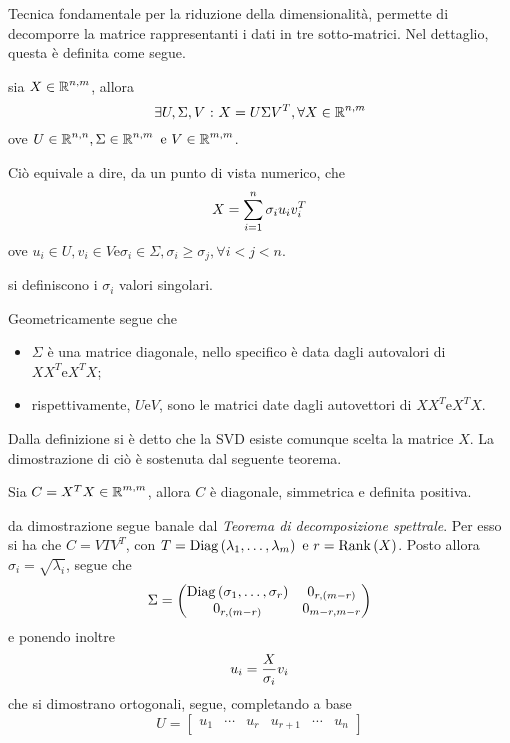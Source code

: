 \documentclass{subfiles}
\begin{document}
Tecnica fondamentale per la riduzione della dimensionalità, permette di decomporre la matrice rappresentanti i dati in tre sotto-matrici.
Nel dettaglio, questa è definita come segue.
\begin{Definition*}
    sia $X \in \operatorname{\mathbb{R}}^{n,m}$, allora
    $$
        \exists U, \Sigma, V \operatorname{\, : \,} X = U\Sigma V^{T}, \forall X \in \operatorname{\mathbb{R}}^{n, m}
    $$
    ove $U \in \Real^{n,n} , \Sigma \in \Real^{n,m} \text{e} V \in \Real^{m,m}$.
\end{Definition*}
Ciò equivale a dire, da un punto di vista numerico, che
$$
    X = \Sum{\sigma_{i}u_{i}v_{i}^{T}}{i = 1}[n]
$$
ove $u_{i} \in U, v_{i} \in V \text{e} \sigma_{i} \in \Sigma, \sigma_{i} \ge \sigma_{j}, \forall i < j < n$.\\
\begin{MarginNote}
    si definiscono i $\sigma_{i}$ valori singolari.
\end{MarginNote}
Geometricamente segue che
\begin{itemize}
    \item $\Sigma$ è una matrice diagonale, nello specifico è data dagli autovalori di $XX^{T} \text{e} X^{T}X$;
    \item rispettivamente, $U \text{e} V$, sono le matrici date dagli autovettori di $XX^{T} \text{e} X^{T}X$.
\end{itemize}

Dalla definizione si è detto che la SVD esiste comunque scelta la matrice $X$. La dimostrazione di ciò è sostenuta dal seguente teorema.
\begin{Theorem*}
    Sia $C = X^{T}X \in \operatorname{\mathbb{R}}^{m,m}$, allora $C$ è diagonale, simmetrica e definita positiva.
    \begin{Proof*}
        da dimostrazione segue banale dal \emph{Teorema di decomposizione spettrale}.
        Per esso si ha che $C = V T V^{T}$, con $T = \Diagonal{\List{\lambda}{1}{m}} \text{e} r = \RankOf{X}$.
        Posto allora $\sigma_{i} = \sqrt{\lambda_{i}}$, segue che
        $$\Sigma = \begin{pmatrix}
                \operatorname{Diag} \left({{\sigma}_{1}, \ldots, {\sigma}_{r}}\right) & 0_{r, (m - r)}   \\
                0_{r, (m - r)}                 & 0_{m - r, m - r} \\
            \end{pmatrix}$$
        e ponendo inoltre
        $$
            u_{i} = \Frac{X}{\sigma_{i}}v_{i}
        $$
        che si dimostrano ortogonali, segue, completando a base
        $$U = \begin{bmatrix}
                u_{1} & \cdots & u_{r} & u_{r + 1} & \cdots & u_{n}
            \end{bmatrix}$$
    \end{Proof*}
\end{Theorem*}
\end{document}
